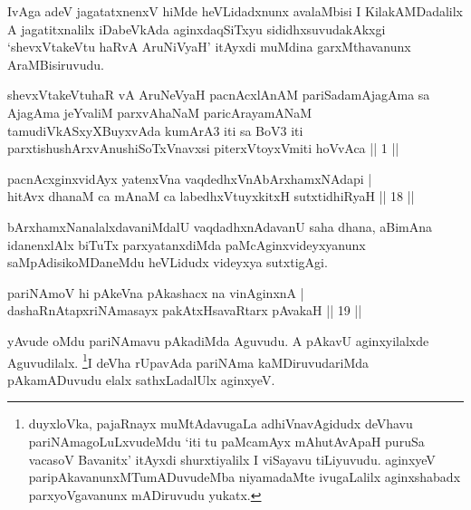 \begin{artha}
IvAga adeV jagatatxnenxV hiMde heVLidadxnunx avalaMbisi I KilakAMDadalilx A jagatitxnalilx iDabeVkAda aginxdaqSiTxyu sididhxsuvudakAkxgi `shevxVtakeVtu haRvA AruNiVyaH' itAyxdi muMdina garxMthavanunx AraMBisiruvudu.
\end{artha}

\centerline{}

\begin{shl}
shevxVtakeVtuhaR vA AruNeVyaH pacnAcxlAnAM pariSadamAjagAma sa AjagAma jeYvaliM parxvAhaNaM paricArayamANaM tamudiVkASxyXBuyxvAda kumArA3 iti sa BoV3 iti parxtishushArxvAnushiSoTxV\s navxsi piterxVtoyxVmiti hoVvAca || 1 ||
\end{shl}


\begin{shl}
pacnAcxginxvidAyx yatenxVna vaqdedhxVnAbArxhamxNAdapi | \\
hitAvx dhanaM ca mAnaM ca labedhxVtuyxkitxH sutxtidhiRyaH \hfill|| 18 || 
\end{shl}

\begin{artha}
bArxhamxNanalalxdavaniMdalU vaqdadhxnAdavanU saha dhana, aBimAna idanenxlAlx biTuTx parxyatanxdiMda paMcAginxvideyxyanunx saMpAdisikoMDaneMdu heVLidudx videyxya sutxtigAgi.
\end{artha}


\begin{shl}
pariNAmoV hi pAkeVna pAkashacx na vinA\s ginxnA | \\
dashaRnAtapxriNAmasayx pakAtxHsavaRtarx pAvakaH \hfill|| 19 || 
\end{shl}

\begin{artha}
yAvude oMdu pariNAmavu pAkadiMda Aguvudu. A pAkavU aginxyilalxde 
Aguvudilalx. \footnote[1]{duyxloVka, pajaRnayx muMtAdavugaLa 
adhiVnavAgidudx deVhavu pariNAmagoLuLxvudeMdu `iti tu paMcamAyx mAhutAvApaH puruSa vacasoV Bavanitx' itAyxdi 
shurxtiyalilx I viSayavu tiLiyuvudu. aginxyeV 
paripAkavanunxMTumADuvudeMba niyamadaMte ivugaLalilx aginxshabadx 
parxyoVgavanunx mADiruvudu yukatx.}I deVha rUpavAda pariNAma kaMDiruvudariMda 
pAkamADuvudu elalx sathxLadalUlx aginxyeV.
\end{artha}

\centerline{}

